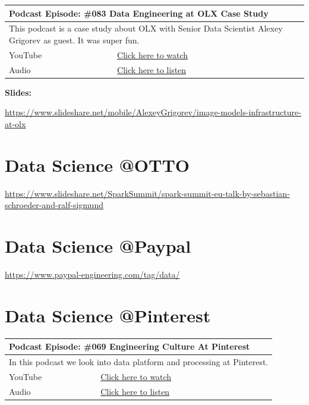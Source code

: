 \documentclass[12pt, numbers=noenddot]{scrreprt} %
\begin{document}
\begin{table}[h]
\begin{tabular}{ll}
\hline
\multicolumn{2}{l}{\textbf{Podcast Episode:} \#083 Data Engineering at OLX Case Study} \\ \hline
\multicolumn{2}{p{15cm}}{This podcast is a case study about OLX with Senior Data Scientist Alexey Grigorev as guest. It was super fun.}         \\ \hline
\multicolumn{1}{l|}{YouTube}   & \href{https://youtu.be/H_uFNoCvykM}{Click here to watch}   \\
\multicolumn{1}{l|}{Audio}     & \href{https://anchor.fm/andreaskayy/episodes/083-Data-Engineering-at-OLX-Case-Study-e45j5n}{Click here to listen}   \\ \hline
\end{tabular}
\end{table}

\textbf{Slides:}

\url{https://www.slideshare.net/mobile/AlexeyGrigorev/image-models-infrastructure-at-olx}




\section{Data Science @OTTO}
\url{https://www.slideshare.net/SparkSummit/spark-summit-eu-talk-by-sebastian-schroeder-and-ralf-sigmund}

\section{Data Science @Paypal}
\url{https://www.paypal-engineering.com/tag/data/}

\section{Data Science @Pinterest}

\begin{table}[h]
\begin{tabular}{ll}
\hline
\multicolumn{2}{l}{\textbf{Podcast Episode:} \#069 Engineering Culture At Pinterest} \\ \hline
\multicolumn{2}{p{15cm}}{In this podcast we look into data platform and processing at Pinterest. }         \\ \hline
\multicolumn{1}{l|}{YouTube}   & \href{https://youtu.be/cqWXGVoDX8Q}{Click here to watch}   \\
\multicolumn{1}{l|}{Audio}     & \href{https://anchor.fm/andreaskayy/episodes/069-Data-Engineering-At-Pinterest-Case-Study-e45ioh}{Click here to listen}   \\ \hline
\end{tabular}
\end{table}
\end{document}
